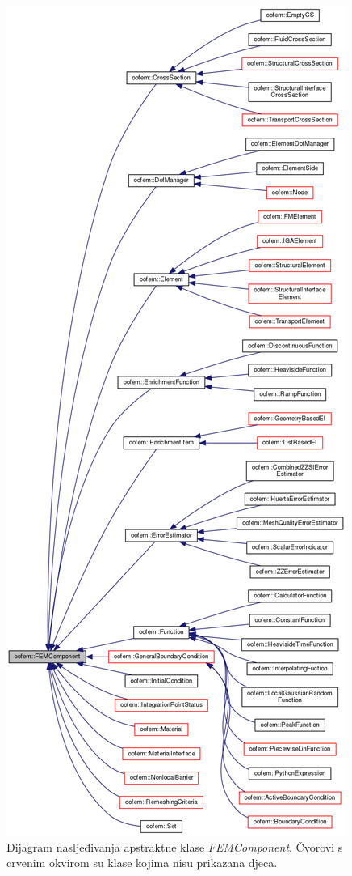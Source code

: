 \documentclass[a4paper,twoside,12pt]{memoir} %
\begin{document}
\begin{figure}[h!t]
\begin{center}
\includegraphics[scale=0.26]{pictures/chapter_oofem/FEMComponent_inheritance.png}
\caption{Dijagram nasljeđivanja apstraktne klase \textit{FEMComponent}. Čvorovi s crvenim okvirom su klase kojima nisu prikazana djeca. \cite{oofem_reference}}
\label{fig:FEMComponent_inheritance}
\end{center}
\end{figure}
\end{document}
